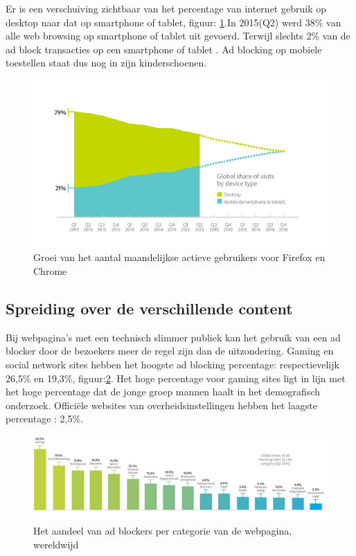 \documentclass[pdftex,a4paper,12pt,twoside]{report}
\begin{document}
Er is een verschuiving zichtbaar van het percentage van internet gebruik op desktop naar dat op smartphone of tablet, figuur: \ref{fig: MobileVsDeskotpInternet}.In 2015(Q2) werd 38\% van alle web browsing op smartphone of tablet uit gevoerd. Terwijl slechts 2\% van de ad block transacties op een smartphone of tablet \cite{PageFair2015}.
Ad blocking op mobiele toestellen staat dus nog in zijn kinderschoenen.

\begin{figure}[h!]
\centering
\includegraphics[width=12cm]{img/MobileVsDeskotpInternet}
\caption{Groei van het aantal maandelijkse actieve gebruikers voor Firefox en Chrome}
\label{fig: MobileVsDeskotpInternet}
\end{figure}

\subsection{Spreiding over de verschillende content}
\label{sec Spreiding over de verschillende content}
Bij webpagina's met een technisch slimmer publiek kan het gebruik van een ad blocker door de bezoekers meer de regel zijn dan de uitzondering. Gaming en social network sites hebben het hoogste ad blocking percentage: respectievelijk 26,5\% en 19,3\%, figuur:\ref{fig: percontent}. Het hoge percentage voor gaming sites ligt in lijn met het hoge percentage dat de jonge groep mannen haalt in het demografisch onderzoek. Officiële websites van overheidsinstellingen hebben het laagste percentage : 2,5\%.

\begin{figure}[h!]
\centering
\includegraphics[width=15cm]{img/percontent}
\caption{Het aandeel van ad blockers per categorie van de webpagina, wereldwijd}
\label{fig: percontent}
\end{figure}
\end{document}
